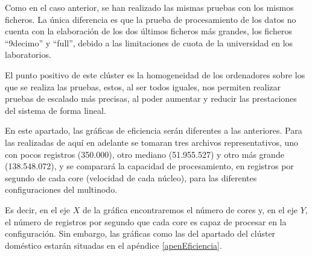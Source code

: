 Como en el caso anterior, se han realizado las mismas pruebas con los mismos ficheros. La única diferencia es que la prueba de procesamiento de los datos no cuenta con la elaboración de los dos últimos ficheros más grandes, los ficheros ``9decimo'' y ``full'', debido a las limitaciones de cuota de la universidad en los laboratorios.

El punto positivo de este clúster es la homogeneidad de los ordenadores sobre los que se realiza las pruebas, estos, al ser todos iguales, nos permiten realizar pruebas de escalado más precisas, al poder aumentar y reducir las prestaciones del sistema de forma lineal.

En este apartado, las gráficas de eficiencia serán diferentes a las anteriores. Para las realizadas de aquí en adelante se tomaran tres archivos representativos, uno con pocos registros (350.000), otro mediano (51.955.527) y otro más grande (138.548.072), y se comparará la capacidad de procesamiento, en registros por segundo de cada core (velocidad de cada núcleo), para las diferentes configuraciones del multinodo.

Es decir, en el eje $X$ de la gráfica encontraremos el número de cores y, en el eje $Y$, el número de registros por segundo que cada core es capaz de procesar en la configuración. Sin embargo, las gráficas como las del apartado del clúster doméstico estarán situadas en el apéndice \ref{apenEficiencia}. 

